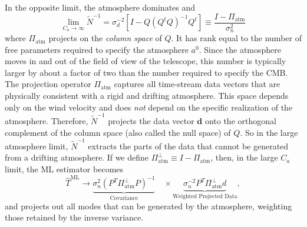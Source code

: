 In the opposite limit, the atmosphere dominates and 
\begin{equation}
    \lim_{C_a \to \infty} \tilde{N}^{-1} = \sigma_d^{-2} \left[
    I - Q \left(Q^t Q \right)^{-1} Q^t  \right] \equiv \frac{I - \Pi_{\text{atm}}}{\sigma_n^2}
\end{equation}
where $\Pi_{\text{atm}}$ projects on the {\it column space} of $Q$. %
It has rank equal to the number of free parameters required to specify the atmosphere $a^0$. Since the atmosphere moves in and out of the field of view of the telescope, this number is typically larger by about a factor of two than the number required to specify the CMB. 
The projection operator $\Pi_{\text{atm}}$ captures all time-stream data vectors that are physically consistent with a rigid and drifting atmosphere. This space depends only on the wind velocity and does \emph{not} depend on the specific realization of the atmosphere. Therefore, $\tilde{N}^{-1}$ projects the data vector $\mathbf{d}$ onto the orthogonal complement of the column space (also called the null space) of $Q$.
So in the large atmosphere limit, $\tilde{N}^{-1}$ extracts the parts of the data that cannot be generated from a drifting atmosphere. If we define $\Pi_{\text{atm}}^{\perp} \equiv I - \Pi_{\text{atm}}$, then, in the large $C_a$ limit,  the ML estimator becomes
\begin{equation}
    \hat{T}^{\text{ML}}
    \rightarrow \underbrace{\sigma_n^2 (P^T \Pi_{\text{atm}}^{\perp} P)^{-1}}_{\text{Covariance}} \quad\times \underbrace{\sigma_n^{-2} P^T \Pi_{\text{atm}}^{\perp} d}_{\text{Weighted Projected Data}},
\end{equation}
and projects out all modes that can be generated by the atmosphere, weighting those retained by the inverse variance. 


